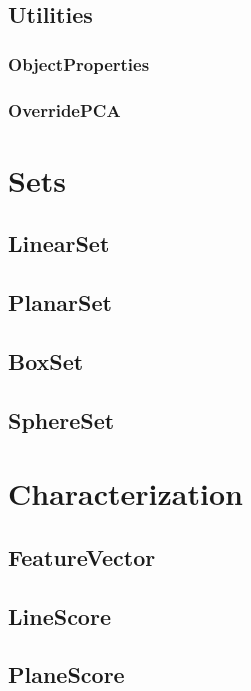 \documentclass{ol-softwaremanual}
\begin{document}
\subsection{Utilities}

\subsubsection{ObjectProperties}

\subsubsection{OverridePCA}

\section{Sets}

\subsection{LinearSet}

\subsection{PlanarSet}

\subsection{BoxSet}

\subsection{SphereSet}

\section{Characterization}
\subsection{FeatureVector}

\subsection{LineScore}

\subsection{PlaneScore}
\end{document}

